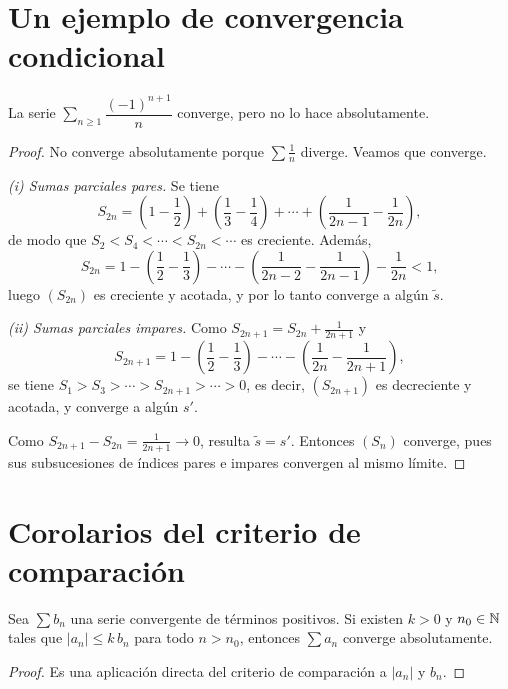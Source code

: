 \section{Un ejemplo de convergencia condicional}

\begin{eg}
  La serie \(\sum_{n \geq 1} \dfrac{(-1)^{n+1}}{n}\) converge, pero no lo hace absolutamente.
\end{eg}

\begin{proof}
  No converge absolutamente porque \(\sum \frac{1}{n}\) diverge. Veamos que converge.

  \emph{(i) Sumas parciales pares.} Se tiene
  \[
    S_{2n} = \left( 1 - \frac{1}{2} \right) + \left( \frac{1}{3} - \frac{1}{4} \right) + \cdots + \left( \frac{1}{2n-1} - \frac{1}{2n} \right),
  \]
  de modo que \(S_2 < S_4 < \cdots < S_{2n} < \cdots\) es creciente. Además,
  \[
    S_{2n} = 1 - \left( \frac{1}{2} - \frac{1}{3} \right) - \cdots - \left( \frac{1}{2n-2} - \frac{1}{2n-1} \right) - \frac{1}{2n} < 1,
  \]
  luego \({(S_{2n})}\) es creciente y acotada, y por lo tanto converge a algún \(\tilde{s}\).

  \emph{(ii) Sumas parciales impares.} Como \(S_{2n+1} = S_{2n} + \frac{1}{2n+1}\) y
  \[
    S_{2n+1} = 1 - \left( \frac{1}{2} - \frac{1}{3} \right) - \cdots - \left( \frac{1}{2n} - \frac{1}{2n+1} \right),
  \]
  se tiene \(S_1 > S_3 > \cdots > S_{2n+1} > \cdots > 0\), es decir, \({(S_{2n+1})}\) es decreciente y acotada, y converge a algún \(s'\).

  Como \(S_{2n+1} - S_{2n} = \frac{1}{2n+1} \to 0\), resulta \(\tilde{s} = s'\). Entonces \({(S_n)}\) converge, pues sus subsucesiones de índices pares e impares convergen al mismo límite.
\end{proof}

\section{Corolarios del criterio de comparación}

\begin{corollary}
  Sea \(\sum b_n\) una serie convergente de términos positivos. Si existen \(k > 0\) y \(n_0 \in \mathbb{N}\) tales que \(|a_n| \leq k\, b_n\) para todo \(n > n_0\), entonces \(\sum a_n\) converge absolutamente.
\end{corollary}

\begin{proof}
  Es una aplicación directa del criterio de comparación a \(|a_n|\) y \(b_n\).
\end{proof}

